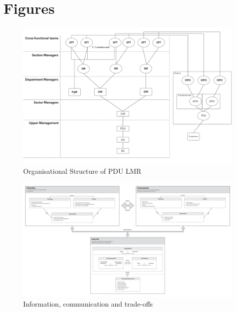 \chapter{Figures}

\begin{figure}[h!]
  \begin{sideways}
    \begin{minipage}{12.7cm}
      \includegraphics[width=1.0\textwidth]{figures/organisational-structure.pdf}
    \end{minipage}
  \end{sideways}
  
  \centering
  \caption{Organisational Structure of PDU LMR}
  \label{fig:org-structure-appendix}
\end{figure}
  
\begin{figure}[h!]
  \begin{sideways}
    \begin{minipage}{20.cm}
      \includegraphics[width=1.0\textwidth]{figures/theming-diagram.pdf}
    \end{minipage}
  \end{sideways}
  
  \centering
  \caption{Information, communication and trade-offs}
  \label{fig:theming-diagram}
\end{figure}

